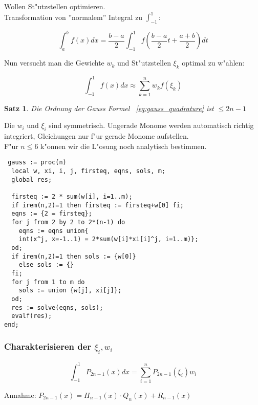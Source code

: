 \documentclass[german, 10pt, a4paper, twocolumn]{scrartcl}
\newtheorem{satz}{Satz}[section]
\theoremstyle{definition}
\begin{document}
Wollen St"utzstellen optimieren.\\

Transformation von ''normalem'' Integral zu $\int^1_{-1}$:

\begin{displaymath}
	\int^b_a f(x) dx = \frac{b-a}{2} \int^1_{-1} f \left (\frac{b-a}{2} t + \frac{a+b}{2} \right ) dt
\end{displaymath}

Nun versucht man die Gewichte $w_k$ und St"utzstellen $\xi_k$ optimal zu w"ahlen:

\begin{equation}
	\int^1_{-1} f(x)dx \approx \sum^n_{k=1} w_k f(\xi_k)
	\label{eq:gauss_quadrature}
\end{equation}

\begin{satz}
	Die Ordnung der Gauss Formel ~\ref{eq:gauss_quadrature} ist $\leq 2n - 1$
\end{satz}

Die $w_i$ und $\xi_i$ sind symmetrisch. Ungerade Monome werden automatisch richtig integriert, Gleichungen nur f"ur gerade Monome aufstellen.\\

F"ur $n\leq 6$ k"onnen wir die L"osung noch analytisch bestimmen.
\small
\begin{verbatim}
 gauss := proc(n)
  local w, xi, i, j, firsteq, eqns, sols, m;
  global res;

  firsteq := 2 * sum(w[i], i=1..m);
  if irem(n,2)=1 then firsteq := firsteq+w[0] fi;
  eqns := {2 = firsteq};
  for j from 2 by 2 to 2*(n-1) do
    eqns := eqns union{
    int(x^j, x=-1..1) = 2*sum(w[i]*xi[i]^j, i=1..m)};
  od;
  if irem(n,2)=1 then sols := {w[0]}
    else sols := {}
  fi;
  for j from 1 to m do
    sols := union {w[j], xi[j]};
  od;
  res := solve(eqns, sols);
  evalf(res);
end;
\end{verbatim}
\normalsize

\subsubsection{Charakterisieren der $\xi_i, w_i$}

\begin{equation}
	\int^1_{-1} P_{2n-1}(x) dx = \sum^n_{i=1} P_{2n-1}(\xi_i)w_i
	\label{eq:gauss_quadrature2}
\end{equation}

Annahme: $P_{2n-1}(x) = H_{n-1}(x)\cdotp Q_n(x) + R_{n-1}(x)$\\
\end{document}
